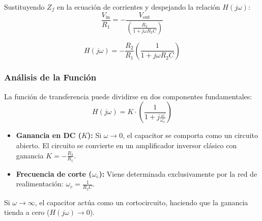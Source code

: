Sustituyendo \(Z_f\) en la ecuación de corrientes y despejando la relación \(H(j\omega)\):
\begin{equation}
  \frac{V_\text{in}}{R_1} = -\frac{V_\text{out}}{\left(\frac{R_2}{1 + j\omega R_2 C}\right)}
\end{equation}

\begin{equation}
  H(j\omega) = -\frac{R_2}{R_1} \left( \frac{1}{1 + j\omega R_2 C} \right)
\end{equation}

\subsubsection{Análisis de la Función}

La función de transferencia puede dividirse en dos componentes fundamentales:
\begin{equation}
  H(j\omega) = K \cdot \left( \frac{1}{1 + j\frac{\omega}{\omega_c}} \right)
\end{equation}

\begin{itemize}
  \item \textbf{Ganancia en DC (\(K\)):} Si \(\omega \to 0\), el capacitor se comporta como un circuito abierto. El circuito se convierte en un amplificador inversor clásico con ganancia \(K = -\frac{R_2}{R_1}\).
  \item \textbf{Frecuencia de corte (\(\omega_c\)):} Viene determinada exclusivamente por la red de realimentación: \(\omega_c = \frac{1}{R_2 C}\).
\end{itemize}

Si \(\omega \to \infty\), el capacitor actúa como un cortocircuito, haciendo que la ganancia tienda a cero (\(H(j\omega) \to 0\)).
